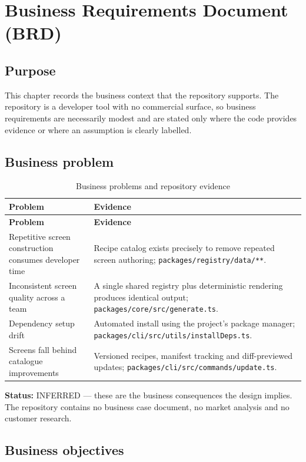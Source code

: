 \chapter{Business Requirements Document (BRD)}
\label{ch:brd}

\section{Purpose}

This chapter records the business context that the repository supports. The
repository is a developer tool with no commercial surface, so business
requirements are necessarily modest and are stated only where the code provides
evidence or where an assumption is clearly labelled.

\section{Business problem}

\begin{longtable}{@{}L{3.4cm}L{11cm}@{}}
\caption{Business problems and repository evidence}\\
\toprule
\textbf{Problem} & \textbf{Evidence} \\
\midrule
\endfirsthead
\toprule
\textbf{Problem} & \textbf{Evidence} \\
\midrule
\endhead
Repetitive screen construction consumes developer time & Recipe catalog exists precisely to remove repeated screen authoring; \texttt{packages/registry/data/**}. \\
Inconsistent screen quality across a team & A single shared registry plus deterministic rendering produces identical output; \texttt{packages/core/src/generate.ts}. \\
Dependency setup drift & Automated install using the project's package manager; \texttt{packages/cli/src/utils/installDeps.ts}. \\
Screens fall behind catalogue improvements & Versioned recipes, manifest tracking and diff-previewed updates; \texttt{packages/cli/src/commands/update.ts}. \\
\bottomrule
\end{longtable}

\textbf{Status:} INFERRED --- these are the business consequences the design
implies. The repository contains no business case document, no market analysis
and no customer research.

\section{Business objectives}

